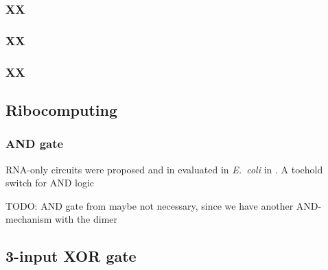 \documentclass[12pt,notitlepage]{article}
\newcommand{\TODO}[1]{\textrm{\color{red}TODO: #1}}
\newcommand{\ra}[1]{{\color{Blue}#1}}
\begin{document}
%

%




\subsubsection*{XX}


\subsubsection*{XX}


\subsubsection*{XX}


\subsection{Ribocomputing}

\subsubsection*{AND gate}

RNA-only circuits
were proposed and in evaluated in \emph{E.~coli} in \cite{GreenETAL2017}.
%
A toehold switch for AND logic
\cite[\href{https://www.nature.com/articles/nature23271/figures/2}{Fig.~2e}]{GreenETAL2017}



\TODO{AND gate from \cite{GreenETAL2017}}
\ra{maybe not necessary, since we have another AND-mechanism
with the dimer}


\subsection{3-input XOR gate}
\end{document}

